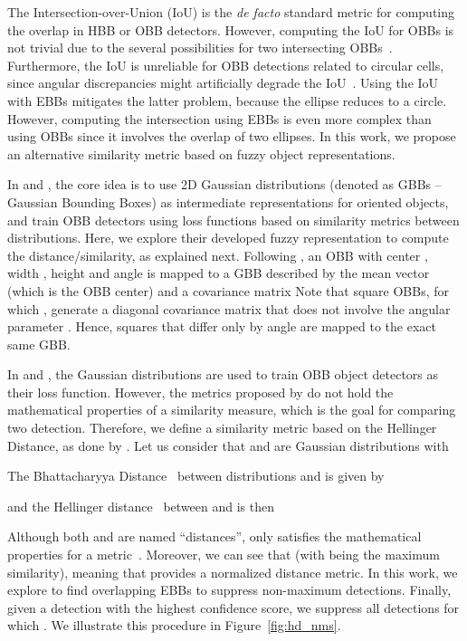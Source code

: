 \documentclass{article}
\begin{document}
The Intersection-over-Union (IoU) is the \textit{de facto} standard metric for computing the overlap in HBB or OBB detectors. However, computing the IoU for OBBs is not trivial due to the several possibilities for two intersecting OBBs~\cite{chen2020piou}. Furthermore, the IoU is unreliable for OBB detections related to circular cells, since angular discrepancies might artificially degrade the IoU~\cite{Murrugarra-Llerena_2022_CVPR}. Using the IoU with EBBs mitigates the latter problem, because the ellipse reduces to a circle. However, computing the intersection using EBBs is even more complex than using OBBs since it involves the overlap of two ellipses. In this work, we propose an alternative similarity metric based on fuzzy object representations.

In \cite{gwd,kld} and \cite{probiou}, the core idea is to use 2D Gaussian distributions (denoted as GBBs -- Gaussian Bounding Boxes) as intermediate representations for oriented objects, and train OBB detectors using loss functions based on similarity metrics between distributions. Here, we explore their developed fuzzy representation to compute the distance/similarity, as explained next. Following \cite{probiou}, an OBB with center , width , height  and angle  is mapped to a GBB described by the mean vector  (which is the OBB center) and a covariance matrix 
Note that square OBBs, for which , generate a diagonal covariance matrix that does not involve the angular parameter . Hence, squares that differ only by angle are mapped to the exact same GBB.

In \cite{gwd,kld} and \cite{probiou}, the Gaussian distributions are used to train OBB object detectors as their loss function. However, the metrics proposed by \cite{gwd,kld} do not hold the mathematical properties of a similarity measure, which is the goal for comparing two detection.
Therefore, we define a similarity metric based on the Hellinger Distance, as done by \cite{probiou}. Let us consider that  and  are Gaussian distributions with 

The Bhattacharyya Distance~\cite{bhattacharyya1946measure} between distributions  and  is given by 

and the Hellinger distance~\cite{hellinger1909neue} between  and  is then


Although both  and  are named ``distances'', only  satisfies the mathematical properties for a metric~\cite{kailath1967divergence}. Moreover, we can see that  (with  being the maximum similarity), meaning that  provides a normalized distance metric. In this work, we explore  to find overlapping EBBs to suppress non-maximum detections. Finally, given a detection  with the highest confidence score, we suppress all detections  for which  . We illustrate this procedure in Figure~\ref{fig:hd_nms}.
\end{document}

